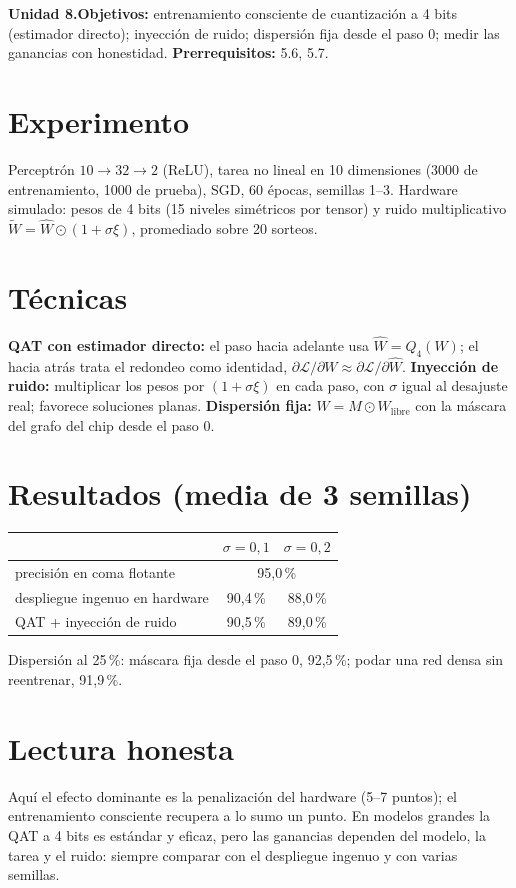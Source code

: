 \documentclass[11pt,a4paper]{article}
\begin{document}

\noindent\textbf{Unidad 8.}\quad\textbf{Objetivos:} entrenamiento consciente de cuantización a 4 bits (estimador directo); inyección de ruido; dispersión fija
desde el paso 0; medir las ganancias con honestidad.
\textbf{Prerrequisitos:} 5.6, 5.7.

\section{Experimento \evS}
Perceptrón $10\to32\to2$ (ReLU), tarea no lineal en 10 dimensiones (3000 de entrenamiento, 1000 de prueba), SGD, 60 épocas, semillas 1--3. Hardware simulado:
pesos de 4 bits (15 niveles simétricos por tensor) y ruido multiplicativo $\tilde W=\hat W\odot(1+\sigma\xi)$, promediado sobre 20 sorteos.

\section{Técnicas}
\textbf{QAT con estimador directo:} el paso hacia adelante usa $\hat W=Q_4(W)$; el hacia atrás trata el redondeo como identidad,
$\partial\mathcal L/\partial W\approx\partial\mathcal L/\partial\hat W$. \textbf{Inyección de ruido:} multiplicar los pesos por $(1+\sigma\xi)$ en cada paso, con $\sigma$ igual al
desajuste real; favorece soluciones planas. \textbf{Dispersión fija:} $W=M\odot W_{\text{libre}}$ con la máscara del grafo del chip desde el paso 0.

\section{Resultados (media de 3 semillas)}
\begin{center}\begin{tabular}{lcc}\toprule
& $\sigma=0{,}1$ & $\sigma=0{,}2$\\\midrule
precisión en coma flotante & \multicolumn{2}{c}{95,0\,\%}\\
despliegue ingenuo en hardware & 90,4\,\% & 88,0\,\%\\
QAT + inyección de ruido & 90,5\,\% & 89,0\,\%\\\bottomrule\end{tabular}\end{center}
Dispersión al 25\,\%: máscara fija desde el paso 0, 92,5\,\%; podar una red densa sin reentrenar, 91,9\,\%.

\section{Lectura honesta}
Aquí el efecto dominante es la penalización del hardware (5--7 puntos); el entrenamiento consciente recupera a lo sumo un punto. En modelos grandes la QAT a 4 bits es estándar
y eficaz, pero las ganancias dependen del modelo, la tarea y el ruido: siempre comparar con el despliegue ingenuo y con varias semillas.
\end{document}
